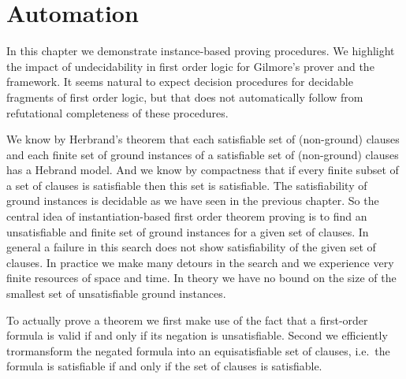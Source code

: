 
\chapter{Automation}



In this chapter we demonstrate instance-based proving procedures.
We highlight the impact of undecidability in first order logic
for Gilmore's prover and the \InstGen framework.
It seems natural to expect decision procedures for decidable fragments of first order logic,
but that does not automatically follow from refutational completeness of these procedures.


%
We know by Herbrand's theorem 
that each satisfiable set of (non-ground) clauses
and each finite set of ground instances of a satisfiable set of (non-ground) clauses
has a Hebrand model. 
And we know by compactness 
that if every finite subset of a set of clauses is satisfiable then this set is satisfiable.
The satisfiability of ground instances is decidable as we have seen in the previous chapter.
So the central idea of instantiation-based first order theorem proving 
is to find an unsatisfiable and finite set of ground instances for a given set of clauses.
In general a failure in this search does not show satisfiability of the given set of clauses.
In practice we make many detours in the search and we experience very finite resources of space and time. 
In theory we have no bound on the size of the smallest set of unsatisfiable ground instances.



To actually prove a theorem 
we first make use of the fact that a first-order formula is valid if and only if its negation is unsatisfiable.
Second we efficiently trormansform the negated formula into an {\myem equisatisfiable} set of clauses,
i.e.~the formula is satisfiable if and only if the set of clauses is satisfiable.

